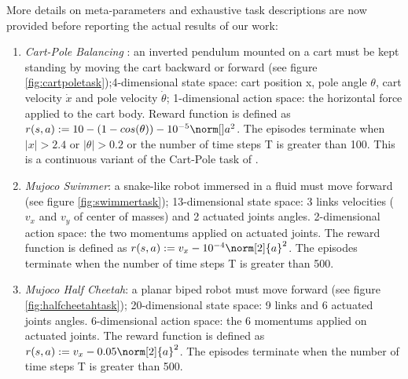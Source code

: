 More details on meta-parameters and exhaustive task descriptions are now provided before reporting the actual results of our work:
\begin{enumerate}
	\item \emph{Cart-Pole Balancing} : an inverted pendulum mounted on a cart must be kept standing by moving the cart backward or forward (see figure \ref{fig:cartpoletask});4-dimensional state space: cart position x, pole angle $\theta$, cart velocity $\dot{x}$ and pole velocity $\dot{\theta}$; 1-dimensional action space: the horizontal force applied to the cart body. Reward function  is defined as $r(s, a) := 10 - (1 - cos(\theta)) - 10^{-5}\norm[] a^2$. The episodes terminate when $|x|>2.4$ or $|\theta|>0.2$ or the number of time steps T is greater than 100. This is a continuous variant of the Cart-Pole task of \cite{sutton1998reinforcement}.
	\item \emph{Mujoco Swimmer}: a snake-like robot immersed in a fluid must move forward (see figure \ref{fig:swimmertask}); 13-dimensional state space: 3 links velocities ($v_x$ and $v_y$ of center of masses) and 2 actuated joints angles. 2-dimensional action space: the two momentums applied on actuated joints.  The reward function is defined as $r(s, a) := v_x - 10^{-4}\norm[2]{a}^2$. The episodes terminate when the number of time steps T is greater than 500.
	\item \emph{Mujoco Half Cheetah}: a planar biped robot must move forward (see figure \ref{fig:halfcheetahtask}); 20-dimensional state space: 9 links and 6 actuated joints angles. 6-dimensional action space: the 6 momentums applied on actuated joints.  The reward function is defined as $r(s, a) := v_x - 0.05\norm[2]{a}^2$. The episodes terminate when the number of time steps T is greater than 500.
\end{enumerate}
